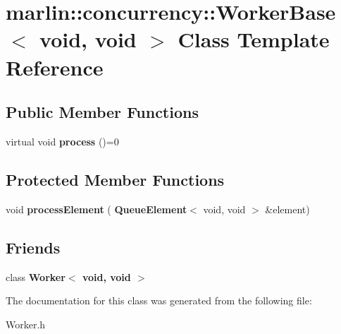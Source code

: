 \section{marlin\+:\+:concurrency\+:\+:Worker\+Base$<$ void, void $>$ Class Template Reference}
\label{classmarlin_1_1concurrency_1_1WorkerBase_3_01void_00_01void_01_4}
\subsection*{Public Member Functions}
\begin{DoxyCompactItemize}
\item 
\mbox{\label{classmarlin_1_1concurrency_1_1WorkerBase_3_01void_00_01void_01_4_a32fbcb5ee5fedf59bf35b6da99c0a7f9}} 
virtual void {\bfseries process} ()=0
\end{DoxyCompactItemize}
\subsection*{Protected Member Functions}
\begin{DoxyCompactItemize}
\item 
\mbox{\label{classmarlin_1_1concurrency_1_1WorkerBase_3_01void_00_01void_01_4_aa1c4e4311d209d6faafc31763595c7de}} 
void {\bfseries process\+Element} (\textbf{ Queue\+Element}$<$ void, void $>$ \&element)
\end{DoxyCompactItemize}
\subsection*{Friends}
\begin{DoxyCompactItemize}
\item 
\mbox{\label{classmarlin_1_1concurrency_1_1WorkerBase_3_01void_00_01void_01_4_ae8398d4a0c34bf21dc4d22748367d6d6}} 
class {\bfseries Worker$<$ void, void $>$}
\end{DoxyCompactItemize}


The documentation for this class was generated from the following file\+:\begin{DoxyCompactItemize}
\item 
Worker.\+h\end{DoxyCompactItemize}
